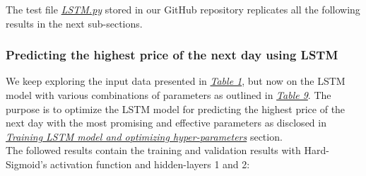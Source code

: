 The test file \href{https://github.com/fabiorodp/UiO-FYS-STK4155/tree/master/Project3/LSTM.py}{\textit{LSTM.py}} stored in our GitHub repository replicates all the following results in the next sub-sections.

\subsubsection{Predicting the highest price of the next day using LSTM}
\label{chap:Predicting the highest price of the next day using LSTM}

\quad We keep exploring the input data presented in \hyperref[table:TrainingFeatures]{\textit{Table 1}}, but now on the LSTM model with various combinations of parameters as outlined in \hyperref[table:Hyper-parameters for LSTM]{\textit{Table 9}}. The purpose is to optimize the LSTM model for predicting the highest price of the next day with the most promising and effective parameters as disclosed in \hyperref[chap:Training LSTM model and optimizing hyper-parameters]{\textit{Training LSTM model and optimizing hyper-parameters}} section.\\

The followed results contain the training and validation results with Hard-Sigmoid's activation function and hidden-layers 1 and 2:

